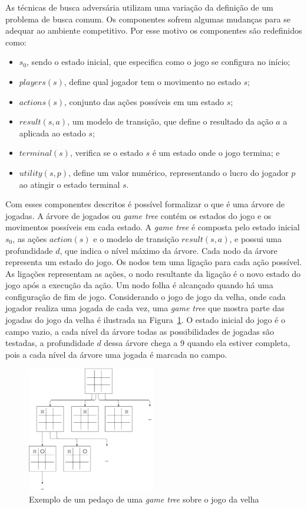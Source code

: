 As técnicas de busca adversária utilizam uma variação da definição de um problema de busca comum. 
Os componentes sofrem algumas mudanças para se adequar ao ambiente competitivo.
Por esse motivo os componentes são redefinidos como:

\begin{itemize}
	\item $s_{0}$, sendo o estado inicial, que especifica como o jogo se configura no início;
	\item $players(s)$, define qual jogador tem o movimento no estado $s$;
	\item $actions(s)$, conjunto das ações possíveis em um estado $s$;
	\item $result(s, a)$, um modelo de transição, que define o resultado da ação $a$ a aplicada ao estado $s$;
	\item $terminal(s)$, verifica se o estado $s$ é um estado onde o jogo termina; e
	\item $utility(s,p)$, define um valor numérico, representando o lucro do jogador $p$ ao atingir o estado terminal $s$.
\end{itemize}

Com esses componentes descritos é possível formalizar o que é uma árvore de jogadas. 
A árvore de jogados ou \textit{game tree} contém os estados do jogo e os movimentos possíveis em cada estado. 
A \textit{game tree} é composta pelo estado inicial $s_{0}$, as ações $action(s)$ e o modelo de transição $result(s, a)$, e possui uma profundidade $d$, que indica o nível máximo da árvore. 
Cada nodo da árvore representa um estado do jogo. 
Os nodos tem uma ligação para cada ação possível. As ligações representam as ações, o nodo resultante da ligação é o novo estado do jogo após a execução da ação.
Um nodo folha é alcançado quando há uma configuração de fim de jogo.
Considerando o jogo de jogo da velha, onde cada jogador realiza uma jogada de cada vez, uma \textit{game tree} que mostra parte das jogadas do jogo da velha é ilustrada na Figura~\ref{fig:jogodavelha}. 
O estado inicial do jogo é o campo vazio, a cada nível da árvore todas as possibilidades de jogadas são testadas, a profundidade $d$ dessa árvore chega a 9 quando ela estiver completa, pois a cada nível da árvore uma jogada é marcada no campo. 

\begin{figure}[ht]
	\centering
	\includegraphics[width=0.5\textwidth]{fig/jogodavelha.pdf}
	\caption{Exemplo de um pedaço de uma \textit{game tree} sobre o jogo da velha}
	\label{fig:jogodavelha}
\end{figure} 

